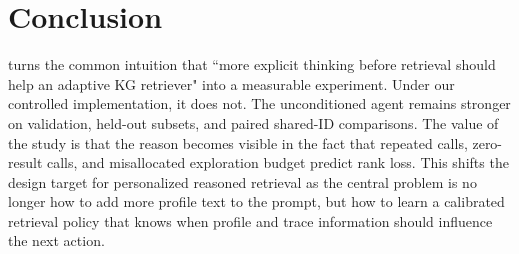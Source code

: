 \section{Conclusion}
\tb turns the common intuition that ``more explicit thinking before retrieval should help an adaptive KG retriever" into a measurable experiment. Under our controlled implementation, it does not. The unconditioned agent remains stronger on validation, held-out subsets, and paired shared-ID comparisons. The value of the study is that the reason becomes visible in the fact that repeated calls, zero-result calls, and misallocated exploration budget predict rank loss. This shifts the design target for personalized reasoned retrieval as the central problem is no longer how to add more profile text to the prompt, but how to learn a calibrated retrieval policy that knows when profile and trace information should influence the next action.
